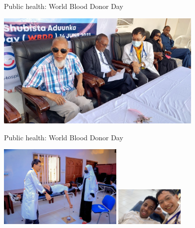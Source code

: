 \documentclass[aspectratio=169]{beamer}
\begin{document}
\begin{frame}{Public health: World Blood Donor Day}
    \begin{center}
        
        \includegraphics[width=0.75\textwidth]{IMG-4378.JPG}
    \end{center}
\end{frame}

\begin{frame}{Public health: World Blood Donor Day}
    \begin{center}
        
        \includegraphics[width=0.45\textwidth]{IMG-5110.JPG}
        \includegraphics[width=0.25\textwidth]{IMG-5112.JPG}
    \end{center}
\end{frame}
\end{document}
